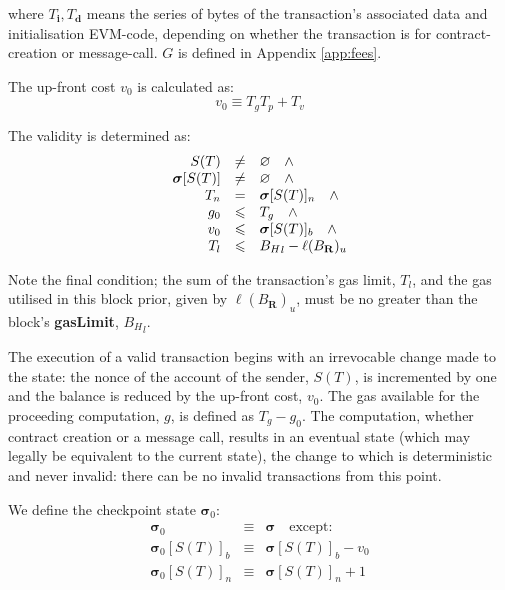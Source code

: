 \documentclass[9pt,oneside]{amsart}
\begin{document}
\begin{multicols}{2}
where $T_\mathbf{i},T_\mathbf{d}$ means the series of bytes of the transaction's associated data and initialisation EVM-code, depending on whether the transaction is for contract-creation or message-call. $G$ is defined in Appendix \ref{app:fees}.


The up-front cost $v_0$ is calculated as:
\begin{equation}
v_0 \equiv T_g T_p + T_v
\end{equation}

The validity is determined as:
\begin{equation}
\begin{array}[t]{rcl}
S(T) & \neq & \varnothing \quad \wedge \\
\boldsymbol{\sigma}[S(T)] & \neq & \varnothing \quad \wedge \\
T_n & = & \boldsymbol{\sigma}[S(T)]_n \quad \wedge \\
g_0 & \leqslant & T_g \quad \wedge \\ 
v_0 & \leqslant & \boldsymbol{\sigma}[S(T)]_b \quad \wedge \\
T_l & \leqslant & {B_H}_l - \ell(B_\mathbf{R})_u
\end{array}
\end{equation}

Note the final condition; the sum of the transaction's gas limit, $T_l$, and the gas utilised in this block prior, given by $\ell(B_\mathbf{R})_u$, must be no greater than the block's \textbf{gasLimit}, ${B_H}_l$. 

The execution of a valid transaction begins with an irrevocable change made to the state: the nonce of the account of the sender, $S(T)$, is incremented by one and the balance is reduced by the up-front cost, $v_0$. The gas available for the proceeding computation, $g$, is defined as $T_g - g_0$. The computation, whether contract creation or a message call, results in an eventual state (which may legally be equivalent to the current state), the change to which is deterministic and never invalid: there can be no invalid transactions from this point.

We define the checkpoint state $\boldsymbol{\sigma}_0$:
\begin{eqnarray}
\boldsymbol{\sigma}_0 & \equiv & \boldsymbol{\sigma} \quad \text{except:} \\
\boldsymbol{\sigma}_0[S(T)]_b & \equiv & \boldsymbol{\sigma}[S(T)]_b - v_0 \\
\boldsymbol{\sigma}_0[S(T)]_n & \equiv & \boldsymbol{\sigma}[S(T)]_n + 1
\end{eqnarray}


\end{multicols}
\end{document}
